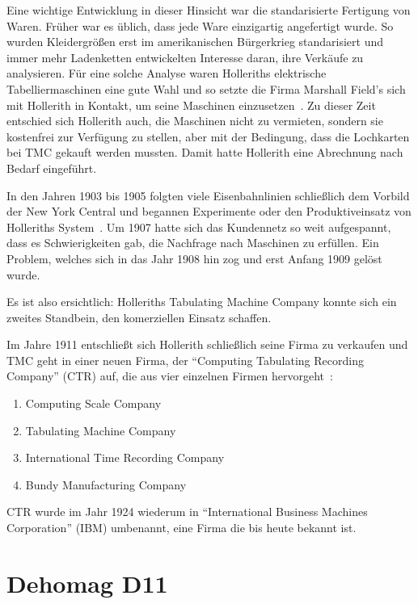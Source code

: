 \documentclass[parskip=half]{scrartcl}
\begin{document}
Eine wichtige Entwicklung in dieser Hinsicht war die standarisierte Fertigung
von Waren. Früher war es üblich, dass jede Ware einzigartig angefertigt wurde.
So wurden Kleidergrößen erst im amerikanischen Bürgerkrieg standarisiert und
immer mehr Ladenketten entwickelten Interesse daran, ihre Verkäufe zu
analysieren. Für eine solche Analyse waren Holleriths elektrische
Tabelliermaschinen eine gute Wahl und so setzte die Firma Marshall Field's sich
mit Hollerith in Kontakt, um seine Maschinen
einzusetzen~\cite{austrian1982herman}. Zu dieser Zeit entschied sich Hollerith
auch, die Maschinen nicht zu vermieten, sondern sie kostenfrei zur Verfügung zu
stellen, aber mit der Bedingung, dass die Lochkarten bei TMC gekauft werden
mussten. Damit hatte Hollerith eine Abrechnung nach Bedarf eingeführt.

In den Jahren 1903 bis 1905 folgten viele Eisenbahnlinien schließlich dem
Vorbild der New York Central und begannen Experimente oder den Produktiveinsatz von
Holleriths System~\cite{austrian1982herman}. Um 1907 hatte sich das Kundennetz
so weit aufgespannt, dass es Schwierigkeiten gab, die Nachfrage nach Maschinen
zu erfüllen. Ein Problem, welches sich in das Jahr 1908 hin zog und erst Anfang
1909 gelöst wurde.

Es ist also ersichtlich: Holleriths Tabulating Machine Company konnte sich ein
zweites Standbein, den komerziellen Einsatz schaffen.

Im Jahre 1911 entschließt sich Hollerith schließlich seine Firma zu verkaufen
und TMC geht in einer neuen Firma, der \enquote{Computing Tabulating Recording
Company} (CTR) auf, die aus vier einzelnen Firmen
hervorgeht~\cite{austrian1982herman}:

\begin{enumerate}
  \item Computing Scale Company
  \item Tabulating Machine Company
  \item International Time Recording Company
  \item Bundy Manufacturing Company
\end{enumerate}

CTR wurde im Jahr 1924 wiederum in \enquote{International Business Machines
Corporation} (IBM) umbenannt, eine Firma die bis heute bekannt ist.

\section{Dehomag D11}
\label{sec:d11}
\end{document}

